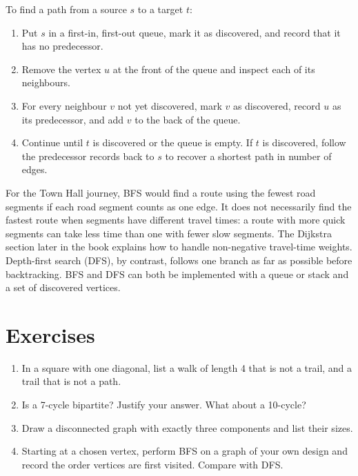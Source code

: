 To find a path from a source $s$ to a target $t$:
\begin{enumerate}
\item Put $s$ in a first-in, first-out queue, mark it as discovered, and record that it has no predecessor.
\item Remove the vertex $u$ at the front of the queue and inspect each of its neighbours.
\item For every neighbour $v$ not yet discovered, mark $v$ as discovered, record $u$ as its predecessor, and add $v$ to the back of the queue.
\item Continue until $t$ is discovered or the queue is empty. If $t$ is discovered, follow the predecessor records back to $s$ to recover a shortest path in number of edges.
\end{enumerate}

For the Town Hall journey, BFS would find a route using the fewest road segments if each road segment counts as one edge. It does not necessarily find the fastest route when segments have different travel times: a route with more quick segments can take less time than one with fewer slow segments. The Dijkstra section later in the book explains how to handle non-negative travel-time weights. Depth-first search (DFS), by contrast, follows one branch as far as possible before backtracking. BFS and DFS can both be implemented with a queue or stack and a set of discovered vertices.

\section*{Exercises}
\begin{enumerate}
\item In a square with one diagonal, list a walk of length 4 that is not a trail, and a trail that is not a path.
\item Is a 7-cycle bipartite? Justify your answer. What about a 10-cycle?
\item Draw a disconnected graph with exactly three components and list their sizes.
\item \Coding{} Starting at a chosen vertex, perform BFS on a graph of your own design and record the order vertices are first visited. Compare with DFS.
\end{enumerate}
